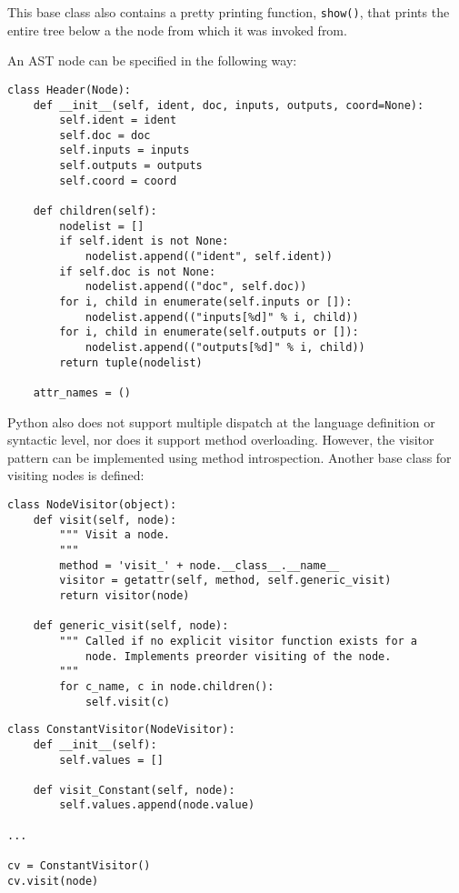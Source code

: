 \noindent This base class also contains a pretty printing function,
\texttt{show()}, that prints the entire tree below a the node from
which it was invoked from.

An AST node can be specified in the following way:

\begin{lstlisting}
class Header(Node):
    def __init__(self, ident, doc, inputs, outputs, coord=None):
        self.ident = ident
        self.doc = doc
        self.inputs = inputs
        self.outputs = outputs
        self.coord = coord

    def children(self):
        nodelist = []
        if self.ident is not None:
            nodelist.append(("ident", self.ident))
        if self.doc is not None:
            nodelist.append(("doc", self.doc))
        for i, child in enumerate(self.inputs or []):
            nodelist.append(("inputs[%d]" % i, child))
        for i, child in enumerate(self.outputs or []):
            nodelist.append(("outputs[%d]" % i, child))
        return tuple(nodelist)

    attr_names = ()
\end{lstlisting}

Python also does not support multiple dispatch at the language
definition or syntactic level, nor does it support method
overloading. However, the visitor pattern can be implemented using
method introspection. Another base class for visiting nodes is
defined:

\begin{lstlisting}
class NodeVisitor(object):
    def visit(self, node):
        """ Visit a node.
        """
        method = 'visit_' + node.__class__.__name__
        visitor = getattr(self, method, self.generic_visit)
        return visitor(node)

    def generic_visit(self, node):
        """ Called if no explicit visitor function exists for a
            node. Implements preorder visiting of the node.
        """
        for c_name, c in node.children():
            self.visit(c)
\end{lstlisting}

\begin{lstlisting}
class ConstantVisitor(NodeVisitor):
    def __init__(self):
        self.values = []

    def visit_Constant(self, node):
        self.values.append(node.value)

...

cv = ConstantVisitor()
cv.visit(node)
\end{lstlisting}
